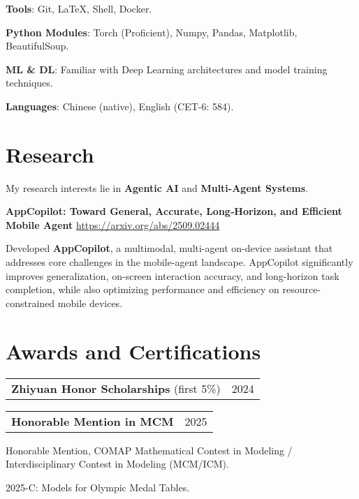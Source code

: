 \documentclass[letterpaper,11pt]{article}
\makeatletter
\newcommand{\twopartheader}[2]{
  \vspace{-2pt}\noindent
  \begin{tabular*}{\textwidth}{l@{\extracolsep{\fill}}r}
    #1 & #2 \\
  \end{tabular*}\vspace{-7pt}
}
\makeatother
\begin{document}
\textbf{Tools}: Git, LaTeX, Shell, Docker.

\textbf{Python Modules}: Torch (Proficient), Numpy, Pandas, Matplotlib, BeautifulSoup.

\textbf{ML \& DL}: Familiar with Deep Learning architectures and model training techniques.

\textbf{Languages}: Chinese (native), English (CET-6: 584).


\section{Research}

My research interests lie in \textbf{Agentic AI} and  \textbf{Multi-Agent Systems}.
\newline

\textbf{AppCopilot: Toward General, Accurate, Long‑Horizon, and Efficient Mobile Agent}
\url{https://arxiv.org/abs/2509.02444}

Developed \textbf{AppCopilot}, a multimodal, multi-agent on-device assistant that addresses core challenges in the mobile-agent landscape. AppCopilot significantly improves generalization, on-screen interaction accuracy, and long-horizon task completion, while also optimizing performance and efficiency on resource-constrained mobile devices.
\newline


\section{Awards and Certifications}

\twopartheader{\textbf{Zhiyuan Honor Scholarships} (first 5\%)}{2024}
\newline

\twopartheader{\textbf{Honorable Mention in MCM}}{2025}

Honorable Mention, COMAP Mathematical Contest in Modeling / Interdisciplinary Contest in Modeling (MCM/ICM).

2025-C: Models for Olympic Medal Tables.
\end{document}
